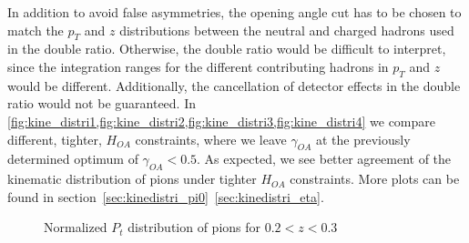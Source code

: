 In addition to avoid false asymmetries, the opening angle cut has to be chosen to match the $p_T$ and $z$ distributions between the neutral and charged hadrons used in the double ratio. Otherwise, the double ratio would be difficult to interpret, since the integration ranges for the different contributing hadrons in $p_T$ and $z$ would be different. Additionally, the cancellation of detector effects in the double ratio would not be guaranteed.
 In \cref{fig:kine_distri1,fig:kine_distri2,fig:kine_distri3,fig:kine_distri4} we compare different, tighter, $H_{OA}$ constraints, where we leave $\gamma_{OA}$ at the previously determined optimum of $\gamma_{OA}<0.5$.
  As expected, we see better agreement of the kinematic distribution of pions under tighter $H_{OA}$ constraints. More plots can be found in section~\ref{sec:kinedistri_pi0}~\ref{sec:kinedistri_eta}.
\begin{figure}[H]
\captionsetup[subfloat]{farskip=2pt,captionskip=1pt}
\centering
{}
\caption{Normalized $P_t$ distribution of pions for $0.2<z<0.3$}
\label{fig:kine_distri1}
\end{figure}

